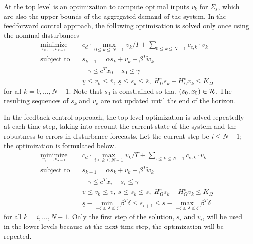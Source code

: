 At the top level is an optimization to compute optimal inputs $v_{k}$ for $\Sigma_{s}$, which are also the upper-bounds of the aggregated demand of the system.
In the feedforward control approach, the following optimization is solved only once using the nominal disturbances
\begin{align*}
  \operatorname*{minimize}_{v_{0}, \ldots, v_{N - 1}} \quad & c_d \cdot \max_{0
  \leqslant k \leqslant N - 1} v_k / T + \textstyle\sum_{0 \leqslant k \leqslant N - 1}
  c_{e, k} \cdot v_k \\
  \text{subject to} \quad & s_{k+1} = \alpha s_{k} + v_{k} + \beta^{T} \tilde{w}_{k}  \nonumber\\
  & -\gamma \leqslant c^{T} x_{0} - s_{0} \leqslant \gamma \\
  & \underline{v} \leqslant v_{k} \leqslant \overbar{v}, \; \underline{s} \leqslant s_{k} \leqslant \overbar{s}, \; H_{\Omega}^{s} s_{k} + H_{\Omega}^{v} v_{k} \leqslant K_{\Omega}
\end{align*}
for all $k=0,\dots,N-1$.
Note that $s_{0}$ is constrained so that $(s_{0}, x_{0}) \in \mathcal{R}$.
The resulting sequences of $s_{k}$ and $v_{k}$ are not updated until the end of the horizon.

In the feedback control approach, the top level optimization is solved repeatedly at each time step, taking into account the current state of the system and the robustness to errors in disturbance forecasts.
Let the current step be $i \leqslant N-1$; the optimization is formulated below.
\begin{align*}
  \operatorname*{minimize}_{v_{i}, \ldots, v_{N - 1}} \quad & c_d \cdot \max_{i
  \leqslant k \leqslant N - 1} v_k / T + \textstyle\sum_{i \leqslant k \leqslant N - 1}
  c_{e, k} \cdot v_k \\
  \text{subject to} \quad & s_{k+1} = \alpha s_{k} + v_{k} + \beta^{T} \tilde{w}_{k}  \nonumber\\
  & -\gamma \leqslant c^{T} x_{i} - s_{i} \leqslant \gamma \\
  & \underline{v} \leqslant v_{k} \leqslant \overbar{v}, \; \underline{s} \leqslant s_{k} \leqslant \overbar{s}, \; H_{\Omega}^{s} s_{k} + H_{\Omega}^{v} v_{k} \leqslant K_{\Omega} \\
  & \underline{s} - \min_{-\zeta \leqslant \delta \leqslant  \zeta} \beta^{T} \delta \leqslant s_{i+1} \leqslant \overbar{s} - \max_{-\zeta \leqslant \delta \leqslant \zeta} \beta^{T} \delta
\end{align*}
for all $k=i,\dots,N-1$.
Only the first step of the solution, \ie $s_{i}$ and $v_{i}$, will be used in the lower levels because at the next time step, the optimization will be repeated.

